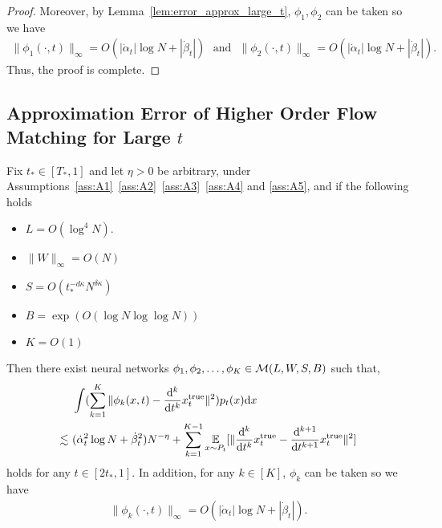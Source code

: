 \begin{proof}
    Moreover, by Lemma~\ref{lem:error_approx_large_t}, $\phi_1, \phi_2$ can be taken so we have
    \begin{align*}
         \|\phi_1(\cdot,t) \|_\infty = O(  |\dot{\alpha}_t | \log N +  |\dot{\beta}_t |) \mathrm{~~~and~~~} \|\phi_2(\cdot,t) \|_\infty = O(  |\dot{\alpha}_t |\log N +  |\dot{\beta}_t |).
    \end{align*}
    Thus, the proof is complete.
\end{proof}

\subsection{Approximation Error of Higher Order Flow Matching for Large \texorpdfstring{$t$}{}}
\begin{theorem}\label{thm:higher_order_large_t:formal}
    Fix $t_{*} \in [T_{*},1]$ and let $\eta>0$ be arbitrary, under Assumptions~\ref{ass:A1}~\ref{ass:A2}~\ref{ass:A3}~\ref{ass:A4} and \ref{ass:A5}, and if the following holds 
    \begin{itemize}
        \item $L = O(\log^4 N )$.
        \item $\|W\|_{\infty} = O(N)$
        \item $S = O(t_{*}^{- d\kappa} N^{\delta\kappa})$
        \item $B = \exp(O (\log N \log \log N ) )$ 
        \item $K = O(1)$
    \end{itemize}
  Then there exist neural networks $\phi_{1},\phi_2, \ldots, \phi_K \in {\cal M}(L,W,S,B)$ such that,
\begin{align*}
    &~ \int (\sum_{k=1}^K\|\phi_k(x, t) - \frac{\mathrm{d}^k}{\mathrm{d} t^k}x_t^\mathrm{true}\|^2) p_t(x) \mathrm{d} x \\ \lesssim &~ (\dot{\alpha}_t^{2} \log N  +   \dot{\beta}_t^{2} ) N^{-\eta} +
    \sum_{k=1}^{K-1}\operatorname*{{\mathbb{E}}}_{x \sim P_t}[\|\frac{\mathrm{d}^k}{\mathrm{d} t^k}x_t^\mathrm{true} - \frac{\mathrm{d}^{k+1}}{\mathrm{d} t^{k+1}}x_t^\mathrm{true}\|^2] 
\end{align*}
    holds for any $t \in [2t_*, 1]$. In addition, for any $k \in [K]$, $\phi_k$ can be taken so we have
    \begin{align*}
         \|\phi_k(\cdot,t) \|_\infty = O(  |\dot{\alpha}_t | \log N +  |\dot{\beta}_t |).
    \end{align*}
\end{theorem}
